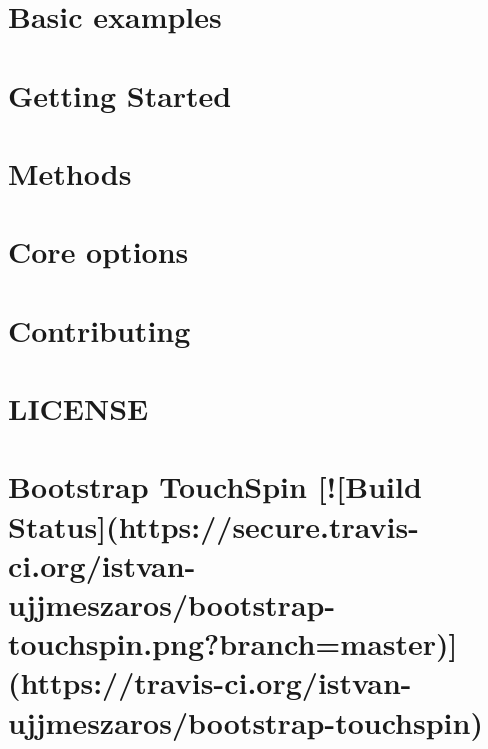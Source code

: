 \documentclass[twoside]{book}
\newcommand{\+}{\discretionary{\mbox{\scriptsize$\hookleftarrow$}}{}{}}
\begin{document}
\chapter{Basic examples}
\label{md_app_web_bower_components_bootstrap-select_docs_docs_examples}

\chapter{Getting Started}
\label{md_app_web_bower_components_bootstrap-select_docs_docs_index}

\chapter{Methods}
\label{md_app_web_bower_components_bootstrap-select_docs_docs_methods}

\chapter{Core options}
\label{md_app_web_bower_components_bootstrap-select_docs_docs_options}

\chapter{Contributing}
\label{md_app_web_bower_components_bootstrap-touchspin__c_o_n_t_r_i_b_u_t_i_n_g}

\chapter{L\+I\+C\+E\+N\+SE}
\label{md_app_web_bower_components_bootstrap-touchspin__l_i_c_e_n_s_e}

\chapter{Bootstrap Touch\+Spin \mbox{[}!\mbox{[}Build Status\mbox{]}(https\+://secure.travis-\/ci.org/istvan-\/ujjmeszaros/bootstrap-\/touchspin.png?branch=master)\mbox{]}(https\+://travis-\/ci.org/istvan-\/ujjmeszaros/bootstrap-\/touchspin)}
\label{md_app_web_bower_components_bootstrap-touchspin__r_e_a_d_m_e}

\end{document}
